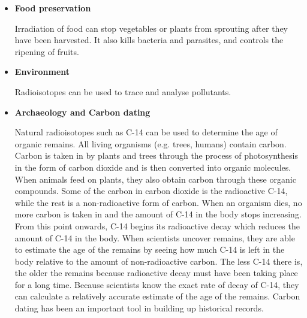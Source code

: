 \begin{itemize}
\item{\textbf{Food preservation}}

Irradiation of food can stop vegetables or plants from sprouting after they have been harvested. It also kills bacteria and parasites, and controls the ripening of fruits.

\item{\textbf{Environment}}

Radioisotopes can be used to trace and analyse pollutants.

\item{\textbf{Archaeology and Carbon dating}}

Natural radioisotopes such as C-14 can be used to determine the age of organic remains. All living organisms (e.g. trees, humans) contain carbon. Carbon is taken in by plants and trees through the process of photosynthesis in the form of carbon dioxide and is then converted into organic molecules. When animals feed on plants, they also obtain carbon through these organic compounds. Some of the carbon in carbon dioxide is the radioactive C-14, while the rest is a non-radioactive form of carbon. When an organism dies, no more carbon is taken in and the amount of C-14 in the body stops increasing. From this point onwards, C-14 begins its radioactive decay which reduces the amount of C-14 in the body. When scientists uncover remains, they are able to estimate the age of the remains by seeing how much C-14 is left in the body relative to the amount of non-radioactive carbon. The less C-14 there is, the older the remains because radioactive decay must have been taking place for a long time. Because scientists know the exact rate of decay of C-14, they can calculate a relatively accurate estimate of the age of the remains. Carbon dating has been an important tool in building up historical records.

\end{itemize}
